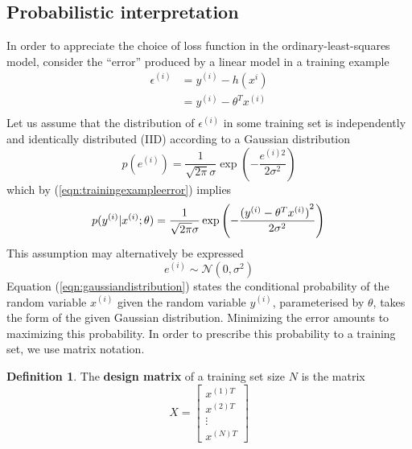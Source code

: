 \documentclass{article}
\theoremstyle{definition}
\newtheorem{definition}{Definition}[section]
\theoremstyle{remark}
\begin{document}
\subsection{Probabilistic interpretation}
In order to appreciate the choice of loss function in the ordinary-least-squares model, consider the ``error'' produced by a linear model in a training example
\begin{align}
    \label{eqn:trainingexampleerror}
    \epsilon^{(i)} &= y^{(i)} - h(x^{i}) \nonumber\\
                &= y^{(i)} - \theta^{T}x^{(i)} \\ \nonumber
\end{align}
Let us assume that the distribution of $\epsilon^{(i)}$ in some training set is independently and identically distributed (IID) according to a Gaussian distribution
\begin{equation}
    p(e^{(i)}) = \frac{1}{\sqrt{2\pi}\sigma}\exp\left(-\frac{e^{(i)2}}{2\sigma^{2}}\right)
\end{equation}
which by (\ref{eqn:trainingexampleerror}) implies
\begin{equation}
    \label{eqn:gaussiandistribution}
    p{(y^{(i)}|x^{(i)}; \theta)} = \frac{1}{\sqrt{2\pi}\sigma}\exp\left(-\frac{{(y^{(i)} - \theta^{T}x^{(i)})}^{2}}{2\sigma^{2}}\right) \\
\end{equation}
This assumption may alternatively be expressed 
\begin{equation}
    e^{(i)} \sim \mathcal{N}(0, \sigma^{2})
\end{equation}
Equation (\ref{eqn:gaussiandistribution}) states the conditional probability of the random variable $x^{(i)}$ given the random variable $y^{(i)}$, parameterised by $\theta$, takes the form of the given Gaussian distribution.
Minimizing the error amounts to maximizing this probability.
In order to prescribe this probability to a training set, we use matrix notation.
\begin{definition}
    The \textbf{design matrix} of a training set size $N$ is the matrix 
    \begin{equation}
    X = \begin{bmatrix}
        x^{(1)T} \\
        x^{(2)T} \\
        \vdots \\
        x^{(N)T}
    \end{bmatrix}
    \end{equation}
\end{definition}
\end{document}
